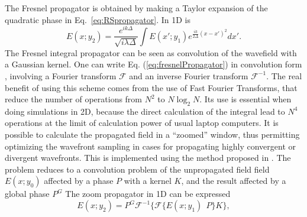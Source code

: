 \documentclass{iopconfser}
\begin{document}
The Fresnel propagator is obtained by making a Taylor expansion of the quadratic phase in Eq.~\ref{eq:RSpropagator}. In 1D is 
\begin{equation}\label{eq:fresnelPropagator}
E(x;y_2) =  \frac{e^{i k \Delta}}{\sqrt{i \lambda \Delta}} \int E(x';y_1) e^{ \frac{i k}{2 \Delta}  (x-x')^2  }  dx'.
\end{equation}
The Fresnel integral propagator can be seen as convolution of the wavefield with a Gaussian kernel. One can write Eq. (\ref{eq:fresnelPropagator}) in convolution form \citep{goodmanfourier}, involving a Fourier transform $\mathcal{F}$ and an inverse Fourier transform $\mathcal{F}^{-1}$. The real benefit of using this scheme comes from the use of Fast Fourier Transforms, that reduce the number of operations from $N^2$ to $N \log_2 N$. Its use is essential when doing simulations in 2D, because the direct calculation of the integral lead to $N^4$ operations at the limit of calculation power of usual laptop computers.
It is possible to calculate the propagated field in a ``zoomed'' window, thus permitting optimizing the wavefront sampling in cases for propagating highly convergent or divergent wavefronts. This is implemented using the method proposed in \citep{schmidt}. The problem reduces to a convolution problem of the unpropagated field field $E(x;y_0)$ affected by a phase $P$ with a kernel $K$, and the result affected by a global phase $P^G$
%
%
The zoom propagator in 1D can be expressed 
\begin{equation}
E(x; y_2) = P^G \mathcal{F}^{-1} \Big\{ \mathcal{F} \big\{ E(x;y_1)~~P \big\} K \Big\},
\end{equation}
\end{document}
